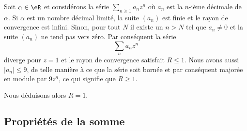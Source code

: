 \begin{example}
    Soit \( \alpha\in \eR\) et considérons la série \( \sum_{n\geq 1}a_nz^n\) où \( a_n\) est la \( n\)-ième décimale de \( \alpha\). Si \( \alpha\) est un nombre décimal limité, la suite \( (a_n)\) est finie et le rayon de convergence est infini. Sinon, pour tout \( N\) il existe un \( n>N\) tel que \( a_n\neq 0\) et la suite \( (a_n)\) ne tend pas vers zéro. Par conséquent la série
    \begin{equation}
        \sum_{n}a_nz^n
    \end{equation}
    diverge pour \( z=1\) et le rayon de convergence satisfait \( R\leq 1\). Nous avons aussi \( | a_n |\leq 9\), de telle manière à ce que la série soit bornée et par conséquent majorée en module par \( 9z^n\), ce qui signifie que \( R\geq 1\).

    Nous déduisons alors \( R=1\).
\end{example}

\subsection{Propriétés de la somme}

